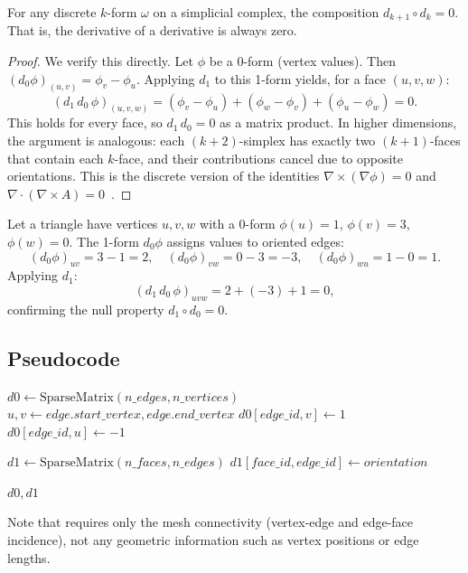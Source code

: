 \begin{theorem}\label{thm:d_squared_zero}
For any discrete $k$-form $\omega$ on a simplicial complex, the composition $d_{k+1} \circ d_k = 0$. That is, the derivative of a derivative is always zero.
\end{theorem}

\begin{proof}
We verify this directly. Let $\phi$ be a 0-form (vertex values). Then $(d_0 \phi)_{(u,v)} = \phi_v - \phi_u$. Applying $d_1$ to this 1-form yields, for a face $(u,v,w)$:
\[
(d_1 \, d_0 \, \phi)_{(u,v,w)} = (\phi_v - \phi_u) + (\phi_w - \phi_v) + (\phi_u - \phi_w) = 0.
\]
This holds for every face, so $d_1 \, d_0 = 0$ as a matrix product. In higher dimensions, the argument is analogous: each $(k+2)$-simplex has exactly two $(k+1)$-faces that contain each $k$-face, and their contributions cancel due to opposite orientations. This is the discrete version of the identities $\nabla \times (\nabla \phi) = 0$ and $\nabla \cdot (\nabla \times A) = 0$~\cite{desbrun2005}.
\end{proof}

\begin{example}\label{ex:exterior_derivative_triangle}
Let a triangle have vertices $u, v, w$ with a 0-form $\phi(u) = 1$, $\phi(v) = 3$, $\phi(w) = 0$. The 1-form $d_0 \phi$ assigns values to oriented edges:
\[
(d_0 \phi)_{uv} = 3 - 1 = 2, \quad (d_0 \phi)_{vw} = 0 - 3 = -3, \quad (d_0 \phi)_{wu} = 1 - 0 = 1.
\]
Applying $d_1$:
\[
(d_1 \, d_0 \, \phi)_{uvw} = 2 + (-3) + 1 = 0,
\]
confirming the null property $d_1 \circ d_0 = 0$.
\end{example}



\subsection{Pseudocode}
\begin{algorithm}
\caption{Compute Exterior Derivatives}\label{alg:compute_exterior_derivatives}
\begin{algorithmic}
    \State $d0 \gets \text{SparseMatrix}(n\_edges, n\_vertices)$
        \State $u, v \gets edge.start\_vertex, edge.end\_vertex$
        \State $d0[edge\_id, v] \gets 1$
        \State $d0[edge\_id, u] \gets -1$
    \EndFor

    \State $d1 \gets \text{SparseMatrix}(n\_faces, n\_edges)$
            \State $d1[face\_id, edge\_id] \gets orientation$
        \EndFor
    \EndFor

    \Return $d0, d1$
\EndFunction
\end{algorithmic}
\end{algorithm}
Note that  requires only the mesh connectivity (vertex-edge and edge-face incidence), not any geometric information such as vertex positions or edge lengths.

